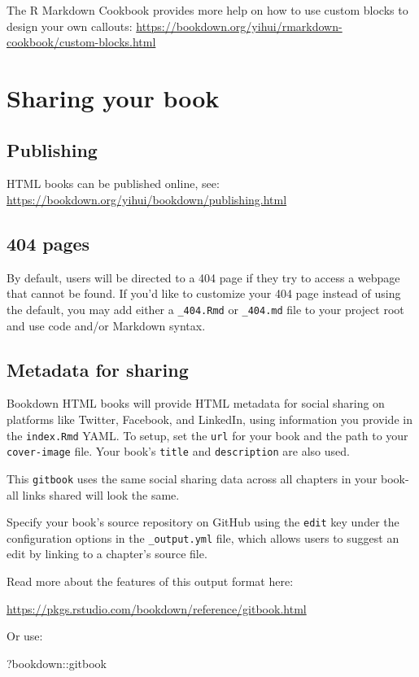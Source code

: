 \documentclass[
]{book}
\newenvironment{Shaded}{\begin{snugshade}}{\end{snugshade}}
\newcommand{\NormalTok}[1]{#1}
\newcommand{\SpecialCharTok}[1]{\textcolor[rgb]{0.00,0.00,0.00}{#1}}
\begin{document}
The R Markdown Cookbook provides more help on how to use custom blocks to design your own callouts: \url{https://bookdown.org/yihui/rmarkdown-cookbook/custom-blocks.html}

\hypertarget{sharing-your-book}{%
\chapter{Sharing your book}\label{sharing-your-book}}

\hypertarget{publishing}{%
\section{Publishing}\label{publishing}}

HTML books can be published online, see: \url{https://bookdown.org/yihui/bookdown/publishing.html}

\hypertarget{pages}{%
\section{404 pages}\label{pages}}

By default, users will be directed to a 404 page if they try to access a webpage that cannot be found. If you'd like to customize your 404 page instead of using the default, you may add either a \texttt{\_404.Rmd} or \texttt{\_404.md} file to your project root and use code and/or Markdown syntax.

\hypertarget{metadata-for-sharing}{%
\section{Metadata for sharing}\label{metadata-for-sharing}}

Bookdown HTML books will provide HTML metadata for social sharing on platforms like Twitter, Facebook, and LinkedIn, using information you provide in the \texttt{index.Rmd} YAML. To setup, set the \texttt{url} for your book and the path to your \texttt{cover-image} file. Your book's \texttt{title} and \texttt{description} are also used.

This \texttt{gitbook} uses the same social sharing data across all chapters in your book- all links shared will look the same.

Specify your book's source repository on GitHub using the \texttt{edit} key under the configuration options in the \texttt{\_output.yml} file, which allows users to suggest an edit by linking to a chapter's source file.

Read more about the features of this output format here:

\url{https://pkgs.rstudio.com/bookdown/reference/gitbook.html}

Or use:

\begin{Shaded}
\begin{Highlighting}[]
\NormalTok{?bookdown}\SpecialCharTok{::}\NormalTok{gitbook}
\end{Highlighting}
\end{Shaded}


  
\end{document}
